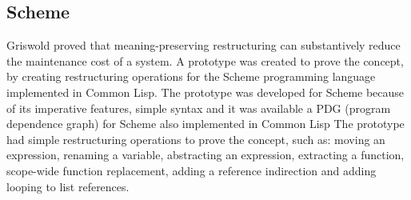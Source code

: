 





\subsection{Scheme}

Griswold \cite{griswold1991program} proved that meaning-preserving restructuring can substantively reduce the maintenance cost of a system.
A prototype was created to prove the concept, by creating restructuring operations for the Scheme programming language implemented in Common Lisp.
The prototype was developed for Scheme because of its imperative features, simple syntax and it was available a PDG (program dependence graph) for Scheme also implemented in Common Lisp
The prototype had simple restructuring operations to prove the concept, such as: moving an expression, renaming a variable, abstracting an expression, extracting a function, scope-wide function replacement, adding a reference indirection and adding looping to list references.

